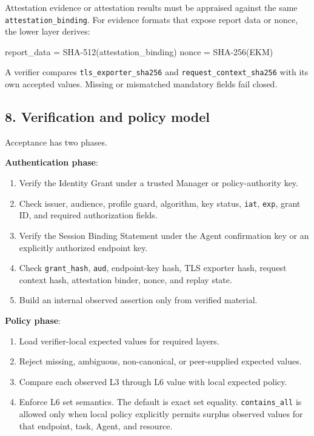 \documentclass[
]{article}
\newenvironment{Shaded}{}{}
\newcommand{\NormalTok}[1]{#1}
\providecommand{\tightlist}{%
  \setlength{\itemsep}{0pt}\setlength{\parskip}{0pt}}
\begin{document}
Attestation evidence or attestation results must be appraised against
the same \texttt{attestation\_binding}. For evidence formats that expose
report data or nonce, the lower layer derives:

\begin{Shaded}
\begin{Highlighting}[]
\NormalTok{report\_data = SHA{-}512(attestation\_binding)}
\NormalTok{nonce       = SHA{-}256(EKM)}
\end{Highlighting}
\end{Shaded}

A verifier compares \texttt{tls\_exporter\_sha256} and
\texttt{request\_context\_sha256} with its own accepted values. Missing
or mismatched mandatory fields fail closed.

\subsection{8. Verification and policy
model}\label{verification-and-policy-model}

Acceptance has two phases.

\textbf{Authentication phase}:

\begin{enumerate}
\def\labelenumi{\arabic{enumi}.}
\tightlist
\item
  Verify the Identity Grant under a trusted Manager or policy-authority
  key.
\item
  Check issuer, audience, profile guard, algorithm, key status,
  \texttt{iat}, \texttt{exp}, grant ID, and required authorization
  fields.
\item
  Verify the Session Binding Statement under the Agent confirmation key
  or an explicitly authorized endpoint key.
\item
  Check \texttt{grant\_hash}, \texttt{aud}, endpoint-key hash, TLS
  exporter hash, request context hash, attestation binder, nonce, and
  replay state.
\item
  Build an internal observed assertion only from verified material.
\end{enumerate}

\textbf{Policy phase}:

\begin{enumerate}
\def\labelenumi{\arabic{enumi}.}
\tightlist
\item
  Load verifier-local expected values for required layers.
\item
  Reject missing, ambiguous, non-canonical, or peer-supplied expected
  values.
\item
  Compare each observed L3 through L6 value with local expected policy.
\item
  Enforce L6 set semantics. The default is exact set equality.
  \texttt{contains\_all} is allowed only when local policy explicitly
  permits surplus observed values for that endpoint, task, Agent, and
  resource.
\end{enumerate}
\end{document}
